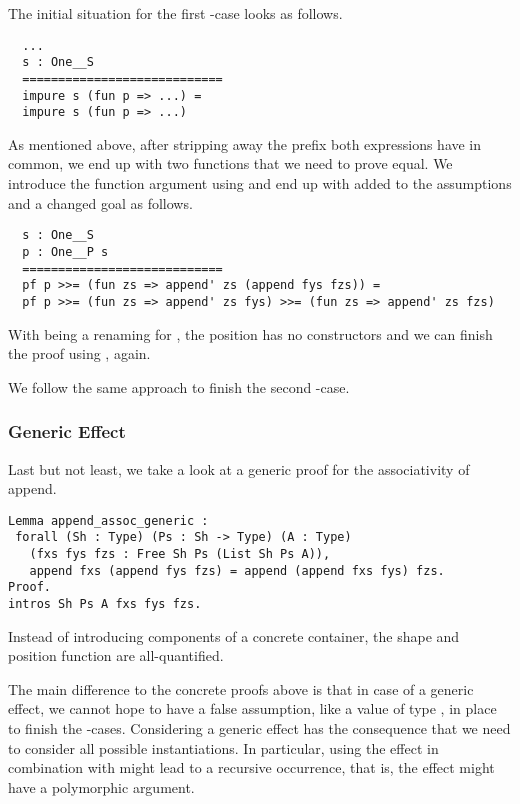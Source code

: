 The initial situation for the first -case looks as
follows.

\begin{verbatim}
  ...
  s : One__S
  ============================
  impure s (fun p => ...) =
  impure s (fun p => ...)
\end{verbatim}

As mentioned above, after stripping away the prefix both expressions
have in common, we end up with two functions that we need to prove
equal.
We introduce the function argument  using  and end up with  added to the assumptions and a changed
goal as follows.

\begin{verbatim}
  s : One__S
  p : One__P s
  ============================
  pf p >>= (fun zs => append' zs (append fys fzs)) =
  pf p >>= (fun zs => append' zs fys) >>= (fun zs => append' zs fzs)
\end{verbatim}

With  being a renaming for , the position
 has no constructors and we can finish the proof using
, again.

We follow the same approach to finish the second -case.

\subsubsection{Generic Effect}
Last but not least, we take a look at a generic proof for the
associativity of append.

\begin{verbatim}
Lemma append_assoc_generic :
 forall (Sh : Type) (Ps : Sh -> Type) (A : Type)
   (fxs fys fzs : Free Sh Ps (List Sh Ps A)),
   append fxs (append fys fzs) = append (append fxs fys) fzs.
Proof.
intros Sh Ps A fxs fys fzs.
\end{verbatim}

Instead of introducing components of a concrete container, the shape
 and position function  are all-quantified.

The main difference to the concrete proofs above is that in case of a
generic effect, we cannot hope to have a false assumption, like a
value of type , in place to finish the
-cases.
Considering a generic effect has the consequence that we need to
consider all possible instantiations.
In particular, using the effect in combination with  might
lead to a recursive occurrence, that is, the effect might have a
polymorphic argument.

